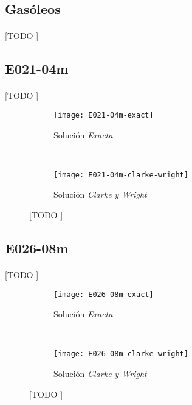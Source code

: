 \documentclass[spanish]{article}
\begin{document}
		\subsection{Gasóleos}

			\paragraph{}
			[TODO ]

		\subsection{E021-04m}

			\paragraph{}
			[TODO ]

			\begin{figure}[h]
				\centering
				\begin{subfigure}{.4\textwidth}
					\centering
					\texttt{[image: E021-04m-exact]}
					\caption{Solución \emph{Exacta}}
				\end{subfigure} \
				\begin{subfigure}{.4\textwidth}
					\centering
					\texttt{[image: E021-04m-clarke-wright]}
					\caption{Solución \emph{Clarke y Wright}}
				\end{subfigure}
				\caption{[TODO ]}
				\label{fig:sol-e021-04m}
			\end{figure}


		\subsection{E026-08m}

			\paragraph{}
			[TODO ]

			\begin{figure}[h]
				\centering
				\begin{subfigure}{.4\textwidth}
					\centering
					\texttt{[image: E026-08m-exact]}
					\caption{Solución \emph{Exacta}}
				\end{subfigure} \
				\begin{subfigure}{.4\textwidth}
					\centering
					\texttt{[image: E026-08m-clarke-wright]}
					\caption{Solución \emph{Clarke y Wright}}
				\end{subfigure}
				\caption{[TODO ]}
				\label{fig:sol-e026-08m}
			\end{figure}
\end{document}
